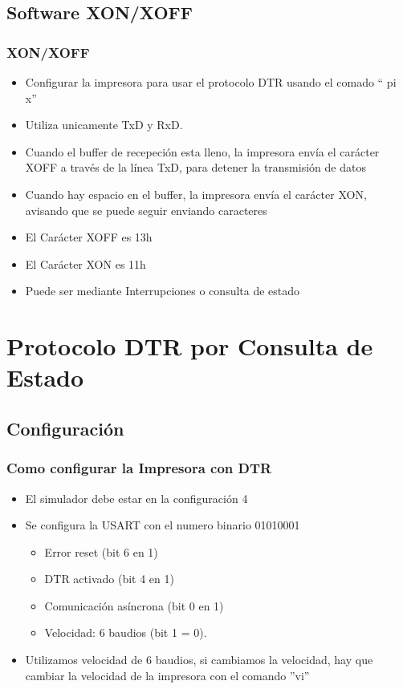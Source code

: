 \documentclass{beamer}
\begin{document}
\subsection{Software XON/XOFF}
\begin{frame}[fragile]
\frametitle{XON/XOFF}
\begin{itemize}
 \item Configurar la impresora para usar el protocolo DTR usando el comado `` pi x''
 \item Utiliza unicamente TxD y RxD.
 \item Cuando el buffer de recepeción esta lleno, la impresora envía el carácter XOFF a través de la línea TxD, para detener la transmisión de datos
 \item Cuando hay espacio en el buffer, la impresora envía el carácter XON, avisando que se puede seguir enviando caracteres
 \item El Carácter XOFF es 13h
 \item El Carácter XON es 11h
 \item Puede ser mediante Interrupciones o consulta de estado
\end{itemize}

\end{frame}



\section{Protocolo DTR por Consulta de Estado}

\subsection{Configuración}
\begin{frame}[fragile]
\frametitle{Como configurar la Impresora con DTR}
\begin{itemize}
 \item El simulador debe estar en la configuración 4
 \item Se configura la USART con el numero binario 01010001
 \begin{itemize}
 \item Error reset (bit 6 en 1)
 \item DTR activado (bit 4 en 1)
 \item Comunicación asíncrona (bit 0 en 1)
 \item Velocidad: 6 baudios (bit 1 = 0).
\end{itemize}
\item Utilizamos velocidad de 6 baudios, si cambiamos la velocidad, hay que cambiar la velocidad de la impresora con el comando ''vi''
\end{itemize}
\end{frame}
\end{document}
